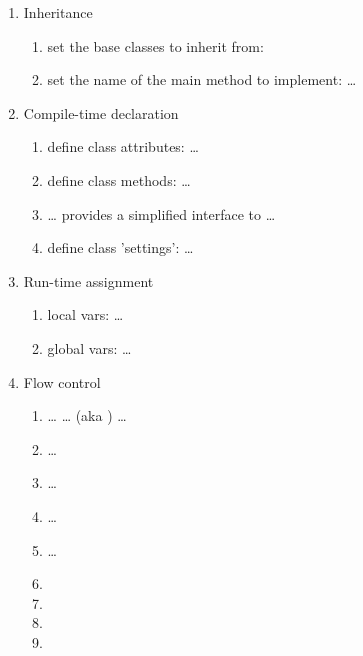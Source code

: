 \begin{enumerate}
\item Inheritance 
     \begin{enumerate}
     \item set the base classes to inherit from: 
     \item set the name of the main method to implement:  \ldots
     \end{enumerate}

\item Compile-time declaration
     \begin{enumerate}
     \item define class attributes:  \ldots
     \item define class methods:  \ldots {}
     \item {} \ldots {} provides a simplified
          interface to  \ldots {}
     \item define class 'settings':  \ldots {}
     \end{enumerate}

\item Run-time assignment
     \begin{enumerate}
     \item local vars:  \ldots
     \item global vars:  \ldots
     \end{enumerate}

\item Flow control
     \begin{enumerate}
     \item {} \ldots {} \ldots {} (aka
          ) \ldots {}
     \item {} \ldots {}
     \item {} \ldots {}
     \item {} \ldots {}
     \item {} \ldots {}
     \item {}
     \item {}
     \item {}
     \item {}
     \end{enumerate}


\end{enumerate}
